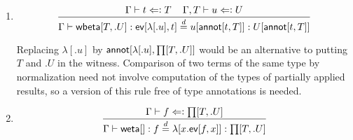 \documentclass[11pt]{article}
\newcommand{\eqd}{\stackrel{d}{=}}
\newcommand{\spc}{{\,\,\,\,\,\,\,}}
\newcommand{\synth}{\vcentcolon\Rightarrow}
\newcommand{\ccheck}{\Leftarrow\vcentcolon}
\newcommand{\ha}[2]{#1[#2]}
\newcommand{\weta}{{\sf weta}}
\newcommand{\annot}{{\sf annot}}
\newcommand{\ev}{{\sf ev}}
\newcommand{\wbeta}{{\sf wbeta}}
\begin{document}
\begin{enumerate}
For simplicity, assume that $f'$ is $f$, and observe that $\Gamma \vdash
\ha\ev{f',t'} \synth U[\ha\annot{t,T}]$ may not be valid, even though $\Gamma
\vdash \ha\ev{f',t'} \synth U[\ha\annot{t',T}]$ is.  Nevertheless, $\Gamma \vdash
\ha\ev{f',t'} : U[\ha\annot{t,T}]$ is valid in the underlying type theory where
the witnesses have been forgotten.

\item 
$$\frac{ \Gamma\vdash t \ccheck T\spc \Gamma, T\vdash u \ccheck U}{\Gamma\vdash \ha\wbeta{T,.U} : \ha\ev{\ha\lambda{.u},t} \eqd u[\ha\annot{t,T}] : U[\ha\annot{t,T}]}$$

Replacing $\ha\lambda{.u}$ by $\ha\annot{\ha\lambda{.u},\ha\prod{T,.U}}$ would
be an alternative to putting $T$ and $.U$ in the witness.  Comparison of two
terms of the same type by normalization need not involve computation of the
types of partially applied results, so a version of this rule free of type
annotations is needed.

\item 
$$\frac{\Gamma\vdash f \ccheck \ha\prod{T,.U}}{\Gamma\vdash \ha\weta{} : f \eqd \ha\lambda{x.\ha\ev{f,x}} : \ha\prod{T,.U}}$$ 

\end{enumerate}



\end{document}
